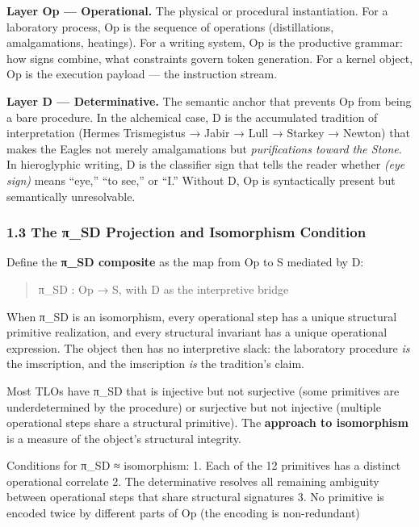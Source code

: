 \documentclass[
  11pt,
  a4paper,
]{article}
\begin{document}
\textbf{Layer Op --- Operational.} The physical or procedural
instantiation. For a laboratory process, Op is the sequence of
operations (distillations, amalgamations, heatings). For a writing
system, Op is the productive grammar: how signs combine, what
constraints govern token generation. For a kernel object, Op is the
execution payload --- the instruction stream.

\textbf{Layer D --- Determinative.} The semantic anchor that prevents Op
from being a bare procedure. In the alchemical case, D is the
accumulated tradition of interpretation (Hermes Trismegistus → Jabir →
Lull → Starkey → Newton) that makes the Eagles not merely amalgamations
but \emph{purifications toward the Stone}. In hieroglyphic writing, D is
the classifier sign that tells the reader whether \emph{(eye sign)} means ``eye,'' ``to
see,'' or ``I.'' Without D, Op is syntactically present but semantically
unresolvable.

\subsubsection{1.3 The π\_SD Projection and Isomorphism
Condition}\label{the-ux3c0_sd-projection-and-isomorphism-condition}

Define the \textbf{π\_SD composite} as the map from Op to S mediated by
D:

\begin{quote}
π\_SD : Op → S, with D as the interpretive bridge
\end{quote}

When π\_SD is an isomorphism, every operational step has a unique
structural primitive realization, and every structural invariant has a
unique operational expression. The object then has no interpretive
slack: the laboratory procedure \emph{is} the imscription, and the
imscription \emph{is} the tradition's claim.

Most TLOs have π\_SD that is injective but not surjective (some
primitives are underdetermined by the procedure) or surjective but not
injective (multiple operational steps share a structural primitive). The
\textbf{approach to isomorphism} is a measure of the object's structural
integrity.

Conditions for π\_SD ≈ isomorphism: 1. Each of the 12 primitives has a
distinct operational correlate 2. The determinative resolves all
remaining ambiguity between operational steps that share structural
signatures 3. No primitive is encoded twice by different parts of Op
(the encoding is non-redundant)
\end{document}
